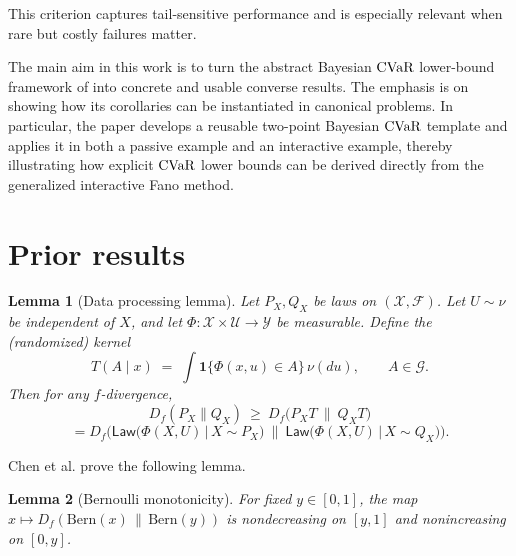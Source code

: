 \documentclass[conference]{IEEEtran}
\newtheorem{lemma}{Lemma}
\begin{document}
 This criterion captures tail-sensitive performance and is especially relevant when rare but costly failures matter.

The main aim in this work is to turn the abstract Bayesian \(\textup{CVaR}\) lower-bound framework of \cite{bongole2026generalizing} into concrete and usable converse results. The emphasis is on showing how its corollaries can be instantiated in canonical problems. In particular, the paper develops a reusable two-point Bayesian \(\textup{CVaR}\) template and applies it in both a passive example and an interactive example, thereby illustrating how explicit \(\textup{CVaR}\) lower bounds can be derived directly from the generalized interactive Fano method.

\iffalse
\section{Prior results}

\begin{lemma}[Data processing lemma]
    Let \(P_X,Q_X\) be laws on \((\mathcal X,\mathcal F)\). 
Let \(U\sim\nu\) be independent of \(X\), and let \(\Phi:\mathcal X\times\mathcal U\to\mathcal Y\) be measurable.
Define the (randomized) kernel
\[
T(A\mid x)\;=\;\int \mathbf 1\{\Phi(x,u)\in A\}\,\nu(du),\qquad A\in\mathcal G.
\]
Then for any \(f\)-divergence,
\[
D_f(P_X\|Q_X)\ \ge\ D_f\big(P_X T\ \|\ Q_X T\big)
\]
\[=D_f\!\Big(\mathsf{Law}\big(\Phi(X,U)\,\big|\,X\sim P_X\big)\ \Big\|\ 
\mathsf{Law}\big(\Phi(X,U)\,\big|\,X\sim Q_X\big)\Big).
\]
\end{lemma}

Chen et al. \cite{chen2024assouad} prove the following lemma.
\begin{lemma}[Bernoulli monotonicity]
\label{lem:bern-mono}
For fixed $y\in[0,1]$, the map $x\mapsto D_f(\mathrm{Bern}(x)\,\|\,\mathrm{Bern}(y))$
is nondecreasing on $[y,1]$ and nonincreasing on $[0,y]$.
\end{lemma}
\end{document}
